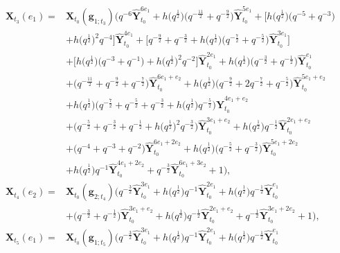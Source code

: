 \documentclass[pdftex]{sigma}
\numberwithin{equation}{section}
\begin{document}
\begin{Example}[type $G_{2}$]
\begin{align*}
 \mathbf{X}_{t_3}(e_1)={}&\mathbf{X}_{t_0}(\mathbf{g}_{1;t_3})\bigl(q^{-6}\mathbf{\hat{Y}}_{t_0}^{6e_1}+h\bigl(q^{\frac{1}{2}}\bigr)\bigl(q^{-\frac{11}{2}}+q^{-\frac{9}{2}}\bigr)
 \mathbf{\hat{Y}}_{t_0}^{5e_1}+\big[h\bigl(q^{\frac{1}{2}}\bigr)\bigl(q^{-5}+q^{-3}\bigr)\\
 & +h\bigl(q^{\frac{1}{2}}\bigr)^2q^{-4}\big]\mathbf{\hat{Y}}_{t_0}^{4e_1}+\big[q^{-\frac{9}{2}}+q^{-\frac{3}{2}}+h\bigl(q^{\frac{1}{2}}\bigr)\bigl(q^{-\frac{7}{2}}+q^{-\frac{5}{2}}\bigr)
 \mathbf{\hat{Y}}_{t_0}^{3e_1}\big]\\
 & +[h\bigl(q^{\frac{1}{2}}\bigr)\bigl(q^{-3}+q^{-1}\bigr)+h\bigl(q^{\frac{1}{2}}\bigr)^2q^{-2}\big]\mathbf{\hat{Y}}_{t_0}^{2e_1}+h\bigl(q^{\frac{1}{2}}\bigr)
 \bigl(q^{-\frac{3}{2}}+q^{-\frac{1}{2}}\bigr)\mathbf{\hat{Y}}_{t_0}^{e_1}\\
 & +\bigl(q^{-\frac{11}{2}}+q^{-\frac{9}{2}}+q^{-\frac{7}{2}}\bigr)\mathbf{\hat{Y}}_{t_0}^{6e_1+e_2}+h\bigl(q^{\frac{1}{2}}\bigr)
 \bigl(q^{-\frac{9}{2}}+2q^{-\frac{7}{2}}+q^{-\frac{5}{2}}\bigr)\mathbf{\hat{Y}}_{t_0}^{5e_1+e_2}\\
 & +h\bigl(q^{\frac{1}{2}}\bigr)\bigl(q^{-\frac{7}{2}}+q^{-\frac{5}{2}}+q^{-\frac{3}{2}}+h\bigl(q^{\frac{1}{2}}\bigr)q^{-\frac{5}{2}}\bigr)\mathbf{\hat{Y}}_{t_0}^{4e_1+e_2}\\
 & +\bigl(q^{-\frac{5}{2}}+q^{-\frac{3}{2}}+q^{-\frac{1}{2}}+h\bigl(q^{\frac{1}{2}}\bigr)^2q^{-\frac{3}{2}}\bigr)\mathbf{\hat{Y}}_{t_0}^{3e_1+e_2}
 +h\bigl(q^{\frac{1}{2}}\bigr)q^{-\frac{1}{2}}\mathbf{\hat{Y}}_{t_0}^{2e_1+e_2}\\
 & +\bigl(q^{-4}+q^{-3}+q^{-2}\bigr)\mathbf{\hat{Y}}_{t_0}^{6e_1+2e_2}+h\bigl(q^{\frac{1}{2}}\bigr)\bigl(q^{-\frac{5}{2}}+q^{-\frac{3}{2}}\bigr)\mathbf{\hat{Y}}_{t_0}^{5e_1+2e_2}\\
 & +h\bigl(q^{\frac{1}{2}}\bigr)q^{-1}\mathbf{\hat{Y}}_{t_0}^{4e_1+2e_2}+q^{-\frac{3}{2}}\mathbf{\hat{Y}}_{t_0}^{6e_1+3e_2}+1
 \bigr),\\
 \mathbf{X}_{t_4}(e_2)={}&\mathbf{X}_{t_0}(\mathbf{g}_{2;t_4})\bigl(q^{-\frac{3}{2}}\mathbf{\hat{Y}}_{t_0}^{3e_1}+h\bigl(q^{\frac{1}{2}}\bigr)q^{-1}\mathbf{\hat{Y}}_{t_0}^{2e_1}
 +h\bigl(q^{\frac{1}{2}}\bigr)q^{-\frac{1}{2}}\mathbf{\hat{Y}}_{t_0}^{e_1}\\
 & +\bigl(q^{-\frac{3}{2}}+q^{-\frac{1}{2}}\bigr)\mathbf{\hat{Y}}_{t_0}^{3e_1+e_2}+h\bigl(q^{\frac{1}{2}}\bigr)q^{-\frac{1}{2}}\mathbf{\hat{Y}}_{t_0}^{2e_1+e_2}
 +q^{-\frac{1}{2}}\mathbf{\hat{Y}}_{t_0}^{3e_1+2e_2}+1
 \bigr),\\
 \mathbf{X}_{t_5}(e_1)={}&\mathbf{X}_{t_0}(\mathbf{g}_{1;t_5})\bigl(q^{-\frac{3}{2}}\mathbf{\hat{Y}}_{t_0}^{3e_1}+h\bigl(q^{\frac{1}{2}}\bigr)q^{-1}\mathbf{\hat{Y}}_{t_0}^{2e_1}+h\bigl(q^{\frac{1}{2}}\bigr)q^{-\frac{1}{2}}\mathbf{\hat{Y}}_{t_0}^{e_1}\\

\end{align*}
\end{Example}
\end{document}
